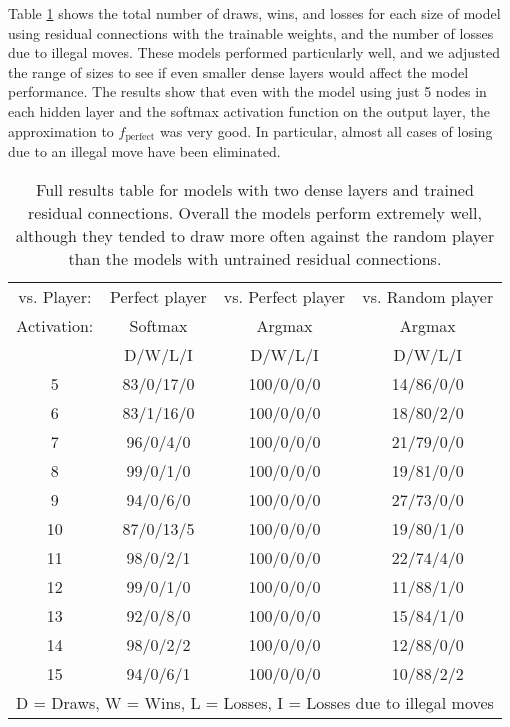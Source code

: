 \documentclass{somasmsc}
\begin{document}
\begin{exa}
Table \ref{ox:t3} shows the total number of draws, wins, and losses for each size of model using residual connections with the trainable weights, and the number of losses due to illegal moves. These models performed particularly well, and we adjusted the range of sizes to see if even smaller dense layers would affect the model performance. The results show that even with the model using just 5 nodes in each hidden layer and the softmax activation function on the output layer, the approximation to $f_{\text{perfect}}$ was very good. In particular, almost all cases of losing due to an illegal move have been eliminated.

\begin{table}[h!]
\centering
\begin{tabular}{ |c|c|c|c| }
 \hline
  vs. Player: & Perfect player & vs. Perfect player & vs. Random player \\
  Activation: & Softmax & Argmax & Argmax \\
  & D/W/L/I & D/W/L/I & D/W/L/I \\
 \hline
 5  & 83/0/17/0 & 100/0/0/0 & 14/86/0/0 \\
 6  & 83/1/16/0 & 100/0/0/0 & 18/80/2/0 \\
 7  & 96/0/4/0  & 100/0/0/0 & 21/79/0/0 \\
 8  & 99/0/1/0  & 100/0/0/0 & 19/81/0/0 \\
 9  & 94/0/6/0  & 100/0/0/0 & 27/73/0/0 \\
 10 & 87/0/13/5 & 100/0/0/0 & 19/80/1/0 \\
 11 & 98/0/2/1  & 100/0/0/0 & 22/74/4/0 \\
 12 & 99/0/1/0  & 100/0/0/0 & 11/88/1/0 \\
 13 & 92/0/8/0  & 100/0/0/0 & 15/84/1/0 \\
 14 & 98/0/2/2  & 100/0/0/0 & 12/88/0/0 \\
 15 & 94/0/6/1  & 100/0/0/0 & 10/88/2/2 \\
 \hline
 \multicolumn{4}{|c|}{D = Draws, W = Wins, L = Losses, I = Losses due to illegal moves} \\
 \hline
\end{tabular}
\caption{Full results table for models with two dense layers and trained residual connections. Overall the models perform extremely well, although they tended to draw more often against the random player than the models with untrained residual connections.}
\label{ox:t3}
\end{table}


\end{exa}
\end{document}
